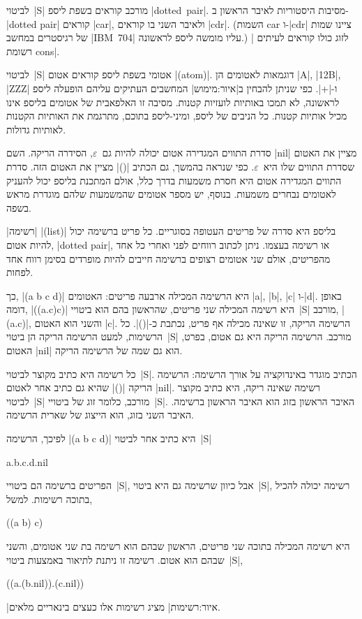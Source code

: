 לביטוי~\E|S| מורכב קוראים בשפת ליספ \E|dotted~pair|. מסיבות היסטוריות לאיבר
הראשון ב-\E|dotted pair| קוראים \E|car|, ולאיבר השני בו קוראים \E|cdr|.
(השמות car ו-\E|cdr| ציינו שמות של רגיסטרים במחשב \E|IBM~704| עליו מומשה ליספ
לראשונה.) לזוג כולו קוראים לעיתים \ע|רשומת cons|.

לביטוי~\E|S| אטומי בשפת ליספ קוראים אטום \E|(atom)|. דוגמאות לאטומים הן \E|A|,
\E|12B|, \E|ZZZ| ו-\E|+|. כפי שניתן להבחין ב|איור:מימוש| המחשבים העתיקים עליהם
הופעלה ליספ לראשונה, לא תמכו באותיות לועזיות קטנות. מסיבה זו האלפאבית של אטומים
בליספ אינו מכיל אותיות קטנות. כל הניבים של ליספ, ומיני-ליספ בתוכם, מתרגמת את
האותיות הקטנות לאותיות גדולות.

סדרת התווים המגדירה אטום יכולה להיות גם~$ε$, הסידרה הריקה. השם \E|nil| מציין את
האטום שסדרת התווים שלו היא~$ε$. כפי שנראה בהמשך, גם הכתיב \E|()| מציין את האטום
הזה. סדרת התווים המגדירה אטום היא חסרת משמעות בדרך כלל, אולם המתכנת בליספ יכול
להעניק לאטומים נבחרים משמעות. בנוסף, יש מספר אטומים שהמשמעות שלהם מוגדרת מראש
בשפה.

\ע|רשימה| \E|(list)| בליספ היא סדרה של פריטים העטופה בסוגריים. כל פריט ברשימה
יכול להיות אטום, \E|dotted pair|, או רשימה בעצמו. ניתן לכתוב רווחים לפני ואחרי
כל אחד מהפריטים, אולם שני אטומים רצופים ברשימה חייבים להיות מופרדים בסימן רווח
אחד לפחות.

כך, \E|(a b c d)| היא הרשימה המכילה ארבעה פריטים: האטומים \E|a|, \E|b|, \E|c|
ו-\E|d|. באופן דומה, \E|((a.c)c)| היא רשימה המכילה שני פריטים, שהראשון בהם הוא
ביטויי~\E|S| מורכב, \E|(a.c)|, והשני הוא האטום \E|c|. הרשימה הריקה, זו שאינה
מכילה אף פריט, נכתבת כ-\E|()|. כל הרשימות, למעט הרשימה הריקה הן ביטוי~\E|S|
מורכב. הרשימה הריקה היא גם אטום, בפרט, האטום \E|nil| הוא גם שמה של הרשימה
הריקה.

כל רשימה היא כתיב מקוצר לביטוי~\E|S|. הכתיב מוגדר באינדוקציה על אורך הרשימה:
הרשימה הריקה \E|()| שהיא גם כתיב אחר לאטום \E|nil|. רשימה שאינה ריקה, היא כתיב
מקוצר לביטוי~\E|S| מורכב, כלומר זוג של ביטויי~\E|S|. האיבר הראשון בזוג הוא
האיבר הראשון ברשימה. האיבר השני בזוג, הוא הייצוג של שארית הרשימה.

לפיכך, הרשימה \E|(a b c d)| היא כתיב אחר לביטוי~\E|S|
\begin{LISP}
a.b.c.d.nil
\end{LISP}

הפריטים ברשימה הם ביטויי~\E|S|, אבל כיוון שרשימה גם היא ביטוי~\E|S|, רשימה
יכולה להכיל בתוכה רשימות. למשל,
\begin{LISP}
  ((a b) c)
\end{LISP}
היא רשימה המכילה בתוכה שני פריטים, הראשון שבהם הוא רשימה בת שני אטומים, והשני
שבהם הוא אטום. רשימה זו ניתנת לתיאור באמצעות ביטוי~\E|S|,
\begin{LISP}
  ((a.(b.nil)).(c.nil))
\end{LISP}
|איור:רשימות| מציג רשימות אלו כעצים בינאריים מלאים.

